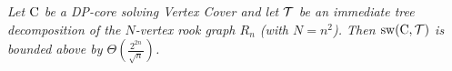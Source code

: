 


\par\medskip
{}
{\it
Let $\mathrm{C}$ be a DP-core solving {\sc Vertex Cover} and let $\mathcal{T}$ be an
immediate tree decomposition of the $N$-vertex rook graph $R_n$ (with $N=n^2$).
Then $\mathrm{sw}(\mathrm{C},\mathcal{T})$ is bounded above by
$\Theta\!\left(\frac{2^{2n}}{\sqrt{n}}\right)$.
}

